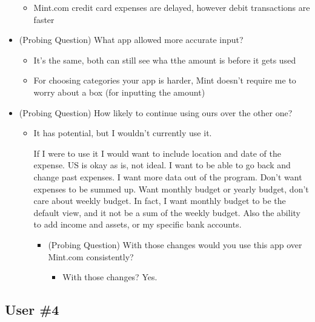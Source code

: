 \documentclass{chi2011}
\begin{document}
\begin{itemize}[noitemsep]
\begin{itemize}[noitemsep]
			\item Mint.com credit card expenses are delayed, however debit transactions are faster
		\end{itemize}
	\item (Probing Question) What app allowed more accurate input?
		\begin{itemize}[noitemsep]
			\item It's the same,  both can still see wha tthe amount is before it gets used
			\item For choosing categories your app is harder, Mint doesn't require me to worry about a
				  box (for inputting the amount)
		\end{itemize}
	\item (Probing Question) How likely to continue using ours over the other one?
		\begin{itemize}[noitemsep]
			\item It has potential, but I wouldn't currently use it.

				  If I were to use it I would want to include location and date of the expense. US is 
				  okay as is, not ideal. I want to be able to go back and change past expenses. I want
				  more data out of the program. Don't want expenses to be summed up. Want monthly budget
				  or yearly budget, don't care about weekly budget. In fact, I want monthly budget to be 
				  the default view, and it not be a sum of the weekly budget. Also the ability to add 
				  income and assets, or my specific bank accounts. 
			\begin{itemize}[noitemsep]
				\item (Probing Question) With those changes would you use this app over Mint.com 
					  consistently? 
				\begin{itemize}[noitemsep]
					\item With those changes? Yes.
				\end{itemize}
			\end{itemize}
		\end{itemize}
	\end{itemize}
	
	
	
	
	\subsection{User \#4}
\end{document}
